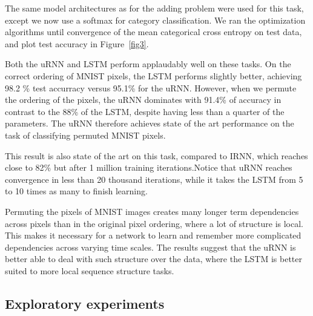 \documentclass{article} %
\begin{document}
The same model architectures as for the adding problem were used for this task, except we now use a 
softmax for category classification. We ran the optimization algorithms until convergence of the 
mean categorical cross entropy on test data, and plot test accuracy in Figure~\ref{fig3}.

Both the uRNN and LSTM perform applaudably well on these tasks.
On the correct ordering of MNIST pixels, the LSTM performs slightly better, achieving 98.2 \% 
test accurracy versus 95.1\% for the uRNN. 
However, when we permute the ordering of the pixels, the uRNN dominates with 91.4\% of accuracy in 
contrast to the 88\% of the LSTM, despite having less than a quarter of the parameters. 
The uRNN therefore achieves state of the art performance on the task of classifying permuted MNIST pixels.

This result is also state of the art on this task, compared to \cite{Quoc2015} IRNN, which reaches 
close to 82\% but after 1 million training iterations.Notice that uRNN reaches convergence in less 
than 20 thousand iterations, while it takes the LSTM from 5 to 10 times as many to finish learning.

Permuting the pixels of MNIST images creates many longer term dependencies across pixels than in the 
original pixel ordering, where a lot of structure is local. This makes it necessary for a network to 
learn and remember more complicated dependencies across varying time scales. 
The results suggest that the uRNN is better able to deal with such structure over the data, where the 
LSTM is better suited to more local sequence structure tasks.  


\subsection{Exploratory experiments}
\end{document}
